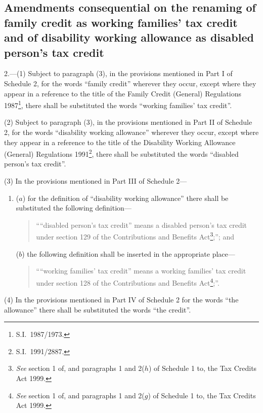 \documentclass[12pt,a4paper]{article}
\begin{document}
\subsection[2. Amendments consequential on the renaming of family credit as working families' tax credit and of disability working allowance as disabled person’s tax credit]{Amendments consequential on the renaming of family credit as working families' tax credit and of disability working allowance as disabled person’s tax credit}

2.---(1)  Subject to paragraph (3), in the provisions mentioned in Part I of Schedule 2, for the words “family credit” wherever they occur, except where they appear in a reference to the title of the Family Credit (General) Regulations 1987\footnote{S.I.\ 1987/1973.}, there shall be substituted the words “working families' tax credit”.

(2) Subject to paragraph (3), in the provisions mentioned in Part II of Schedule 2, for the words “disability working allowance” wherever they occur, except where they appear in a reference to the title of the Disability Working Allowance (General) Regulations 1991\footnote{S.I.\ 1991/2887.}, there shall be substituted the words “disabled person’s tax credit”.

(3) In the provisions mentioned in Part III of Schedule 2—
\begin{enumerate}\item[]
($a$) for the definition of “disability working allowance” there shall be substituted the following definition—
\begin{quotation}
““disabled person’s tax credit” means a disabled person’s tax credit under section 129 of the Contributions and Benefits Act\footnote{\emph{See} section 1 of, and paragraphs 1 and 2($h$)  of Schedule 1 to, the Tax Credits Act 1999.};”; and
\end{quotation}

($b$) the following definition shall be inserted in the appropriate place—
\begin{quotation}
““working families' tax credit” means a working families' tax credit under section 128 of the Contributions and Benefits Act\footnote{\emph{See} section 1 of, and paragraphs 1 and 2($g$)  of Schedule 1 to, the Tax Credits Act 1999.};”.
\end{quotation}
\end{enumerate}

(4) In the provisions mentioned in Part IV of Schedule 2 for the words “the allowance” there shall be substituted the words “the credit”.
\end{document}
